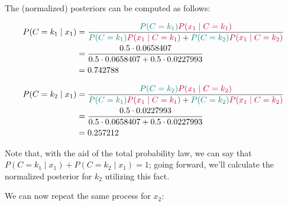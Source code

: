 \documentclass[12pt]{article}
\begin{document}
\begin{enumerate}[leftmargin=\labelsep]
\begin{itemize}[leftmargin=]
                The (normalized) posteriors can be computed as follows:

                \begin{equation*}
                  \begin{aligned}
                    P(C = k_1 \mid x_1) & = \frac{\textcolor{teal}{P(C = k_1)} \textcolor{purple}{P(x_1 \mid C = k_1)}}{\textcolor{teal}{P(C = k_1)} \textcolor{purple}{P(x_1 \mid C = k_1)} + \textcolor{teal}{P(C = k_2)} \textcolor{purple}{P(x_1 \mid C = k_2)}} \\
                                        & = \frac{0.5 \cdot 0.0658407}{0.5 \cdot 0.0658407 + 0.5 \cdot 0.0227993}                                                                                                                                                    \\
                                        & = 0.742788
                  \end{aligned}
                \end{equation*}

                \begin{equation*}
                  \begin{aligned}
                    P(C = k_2 \mid x_1) & = \frac{\textcolor{teal}{P(C = k_2)} \textcolor{purple}{P(x_1 \mid C = k_2)}}{\textcolor{teal}{P(C = k_1)} \textcolor{purple}{P(x_1 \mid C = k_1)} + \textcolor{teal}{P(C = k_2)} \textcolor{purple}{P(x_1 \mid C = k_2)}} \\
                                        & = \frac{0.5 \cdot 0.0227993}{0.5 \cdot 0.0658407 + 0.5 \cdot 0.0227993}                                                                                                                                                    \\
                                        & = 0.257212
                  \end{aligned}
                \end{equation*}

                Note that, with the aid of the total probability law, we can say that
                $P(C = k_1 \mid x_1) + P(C = k_2 \mid x_1) = 1$; going forward, we'll
                calculate the normalized posterior for $k_2$ utilizing this fact.

                We can now repeat the same process for $x_2$:


\end{itemize}
\end{enumerate}
\end{document}
